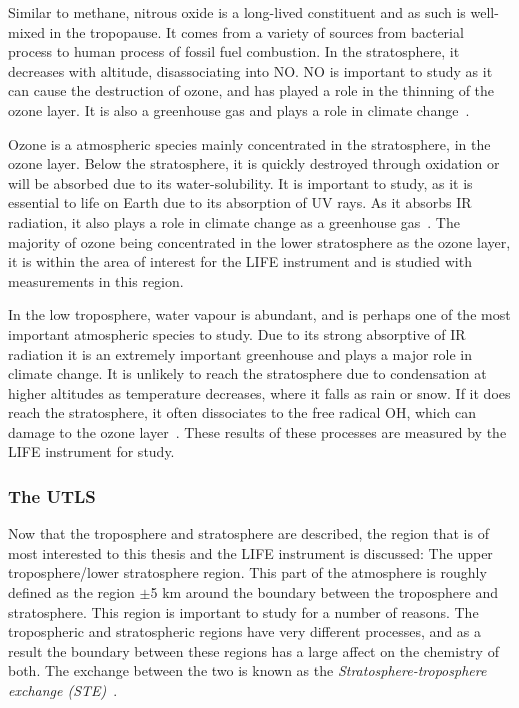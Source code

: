 Similar to methane, nitrous oxide is a long-lived constituent and as such is well-mixed in the tropopause. It comes from a variety of sources from bacterial process to human process of fossil fuel combustion. In the stratosphere, it decreases with altitude, disassociating into NO. NO is important to study as it can cause the destruction of ozone, and has played a role in the thinning of the ozone layer. It is also a greenhouse gas and plays a role in climate change~\citep{atmos_phys_and_climate}.

Ozone is a atmospheric species mainly concentrated in the stratosphere, in the ozone layer. Below the stratosphere, it is quickly destroyed through oxidation or will be absorbed due to its water-solubility. It is important to study, as it is essential to life on Earth due to its absorption of UV rays. As it absorbs IR radiation, it also plays a role in climate change as a greenhouse gas~\citep{atmos_phys_and_climate}. The majority of ozone being concentrated in the lower stratosphere as the ozone layer, it is within the area of interest for the LIFE instrument and is studied with measurements in this region.

In the low troposphere, water vapour is abundant, and is perhaps one of the most important atmospheric species to study. Due to its strong absorptive of IR radiation it is an extremely important greenhouse and plays a major role in climate change. It is unlikely to reach the stratosphere due to condensation at higher altitudes as temperature decreases, where it falls as rain or snow. If it does reach the stratosphere, it often dissociates to the free radical OH, which can damage to the ozone layer~\citep{atmos_phys_and_climate}. These results of these processes are measured by the LIFE instrument for study.

\subsubsection{The UTLS} \label{UTLS}
Now that the troposphere and stratosphere are described, the region that is of most interested to this thesis and the LIFE instrument is discussed: The upper troposphere/lower stratosphere region. This part of the atmosphere is roughly defined as the region $\pm$5 km around the boundary between the troposphere and stratosphere. This region is important to study for a number of reasons. The tropospheric and stratospheric regions have very different processes, and as a result the boundary between these regions has a large affect on the chemistry of both. The exchange between the two is known as the \textit{Stratosphere-troposphere exchange (STE)}~\citep{ext_utls}.

